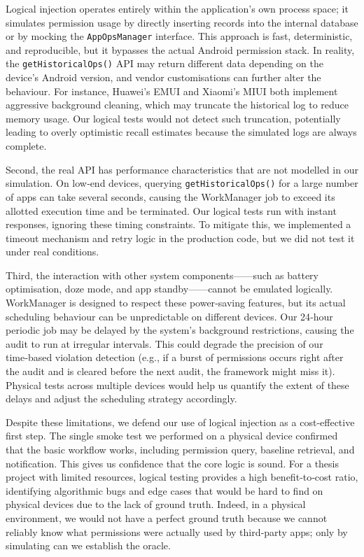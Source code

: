 Logical injection operates entirely within the application's own process space; it simulates permission usage by directly inserting records into the internal database or by mocking the \texttt{AppOpsManager} interface. This approach is fast, deterministic, and reproducible, but it bypasses the actual Android permission stack. In reality, the \texttt{getHistoricalOps()} API may return different data depending on the device's Android version, and vendor customisations can further alter the behaviour. For instance, Huawei's EMUI and Xiaomi's MIUI both implement aggressive background cleaning, which may truncate the historical log to reduce memory usage. Our logical tests would not detect such truncation, potentially leading to overly optimistic recall estimates because the simulated logs are always complete.

Second, the real API has performance characteristics that are not modelled in our simulation. On low‑end devices, querying \texttt{getHistoricalOps()} for a large number of apps can take several seconds, causing the WorkManager job to exceed its allotted execution time and be terminated. Our logical tests run with instant responses, ignoring these timing constraints. To mitigate this, we implemented a timeout mechanism and retry logic in the production code, but we did not test it under real conditions.

Third, the interaction with other system components——such as battery optimisation, doze mode, and app standby——cannot be emulated logically. WorkManager is designed to respect these power‑saving features, but its actual scheduling behaviour can be unpredictable on different devices. Our 24‑hour periodic job may be delayed by the system's background restrictions, causing the audit to run at irregular intervals. This could degrade the precision of our time‑based violation detection (e.g., if a burst of permissions occurs right after the audit and is cleared before the next audit, the framework might miss it). Physical tests across multiple devices would help us quantify the extent of these delays and adjust the scheduling strategy accordingly.

Despite these limitations, we defend our use of logical injection as a cost‑effective first step. The single smoke test we performed on a physical device confirmed that the basic workflow works, including permission query, baseline retrieval, and notification. This gives us confidence that the core logic is sound. For a thesis project with limited resources, logical testing provides a high benefit‑to‑cost ratio, identifying algorithmic bugs and edge cases that would be hard to find on physical devices due to the lack of ground truth. Indeed, in a physical environment, we would not have a perfect ground truth because we cannot reliably know what permissions were actually used by third‑party apps; only by simulating can we establish the oracle.

